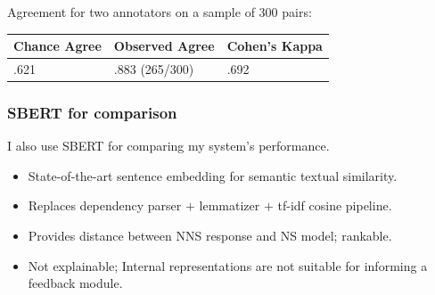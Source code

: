 \documentclass[handout,xcolor={dvipsnames}]{beamer}
\newcommand{\param}[1]{\texttt{#1}}
\begin{document}
\begin{frame}
\pause
Agreement for two annotators on a sample of 300 pairs: \\

\begin{table}[htb!]
\begin{center}
\begin{tabular}{|l|l|l|}
\hline
 Chance Agree & Observed Agree & Cohen's Kappa \\
\hline
.621 & .883 (265/300) & .692 \\
\hline
\end{tabular}
\end{center}
\end{table}


\end{frame}

\begin{frame}
\frametitle{SBERT for comparison}
I also use SBERT for comparing my system's performance.
\vspace{.3em}
\begin{itemize}
\pause
\item State-of-the-art sentence embedding for semantic textual similarity.
\vspace{.3em}
\pause
\item Replaces dependency parser $+$ lemmatizer $+$ tf-idf cosine pipeline. 
\vspace{.3em}
\pause
\item Provides distance between NNS response and NS model; rankable.
\vspace{.3em}
\pause
\item Not explainable; Internal representations are not suitable for informing a feedback module.
\end{itemize}
\end{frame}
\end{document}
